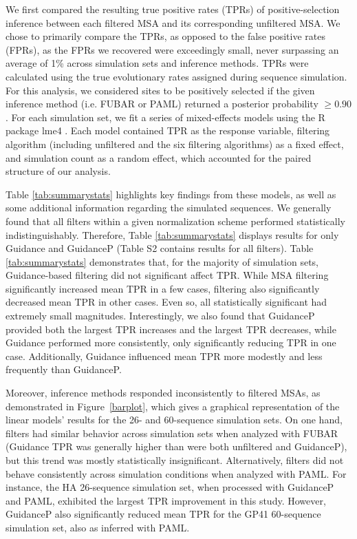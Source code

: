 \documentclass[11pt]{article}
\begin{document}
We first compared the resulting true positive rates (TPRs) of positive-selection inference between each filtered MSA and its corresponding unfiltered MSA. We chose to primarily compare the TPRs, as opposed to the false positive rates (FPRs), as the FPRs we recovered were exceedingly small, never surpassing an average of 1\% across simulation sets and inference methods. TPRs were calculated using the true evolutionary rates assigned during sequence simulation. For this analysis, we considered sites to be positively selected if the given inference method (i.e. FUBAR or PAML) returned a posterior probability $\geq0.90$. For each simulation set, we fit a series of mixed-effects models using the R package lme4 \citep{Bates2012}. Each model contained TPR as the response variable, filtering algorithm (including unfiltered and the six filtering algorithms) as a fixed effect, and simulation count as a random effect, which accounted for the paired structure of our analysis. 

Table \ref{tab:summarystats} highlights key findings from these models, as well as some additional information regarding the simulated sequences. We generally found that all filters within a given normalization scheme performed statistically indistinguishably. Therefore, Table \ref{tab:summarystats} displays results for only Guidance and GuidanceP (Table S2 contains results for all filters). Table \ref{tab:summarystats} demonstrates that, for the majority of simulation sets, Guidance-based filtering did not significant affect TPR. While MSA filtering significantly increased mean TPR in a few cases, filtering also significantly decreased mean TPR in other cases. Even so, all statistically significant had extremely small magnitudes. Interestingly, we also found that GuidanceP provided both the largest TPR increases and the largest TPR decreases, while Guidance performed more consistently, only significantly reducing TPR in one case. Additionally, Guidance influenced mean TPR more modestly and less frequently than GuidanceP.

Moreover, inference methods responded inconsistently to filtered MSAs, as demonstrated in Figure~\ref{barplot}, which gives a graphical representation of the linear models' results for the 26- and 60-sequence simulation sets. On one hand, filters had similar behavior across simulation sets when analyzed with FUBAR (Guidance TPR was generally higher than were both unfiltered and GuidanceP), but this trend was mostly statistically insignificant. Alternatively, filters did not behave consistently across simulation conditions when analyzed with PAML. For instance, the HA 26-sequence simulation set, when processed with GuidanceP and PAML, exhibited the largest TPR improvement in this study. However, GuidanceP also significantly reduced mean TPR for the GP41 60-sequence simulation set, also as inferred with PAML. 
\end{document}
